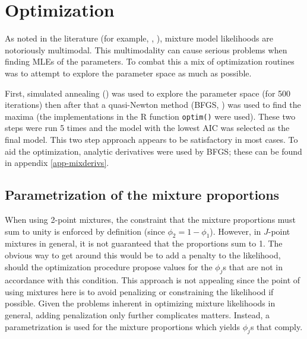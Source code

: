 
\section{Optimization}
\label{s:optimization}

As noted in the literature (for example, \cite[463-480]{BDA}, \cite{robert}), mixture model likelihoods are notoriously multimodal. This multimodality can cause serious problems when finding MLEs of the parameters. To combat this a mix of optimization routines was to attempt to explore the parameter space as  much as possible.

First, simulated annealing (\cite[pp. 549-554]{numrec}) was used to explore the parameter space (for 500 iterations) then after that a quasi-Newton method (BFGS, \cite{bfgs}) was used to find the maxima (the implementations in the \textsf{R} function \texttt{optim()} were used). These two steps were run 5 times and the model with the lowest AIC was selected as the final model. This two step approach appears to be satisfactory in most cases. To aid the optimization, analytic derivatives were used by BFGS; these can be found in appendix \ref{app-mixderivs}.

\subsection{Parametrization of the mixture proportions}
\label{ds-mixpar}

When using 2-point mixtures, the constraint that the mixture proportions must sum to unity is enforced by definition (since $\phi_2=1-\phi_1$). However, in $J$-point mixtures in general, it is not guaranteed that the proportions sum to 1. The obvious way to get around this would be to add a penalty to the likelihood, should the optimization procedure propose values for the $\phi_j$s that are not in accordance with this condition. This approach is not appealing since the point of using mixtures here is to avoid penalizing or constraining the likelihood if possible. Given the problems inherent in optimizing mixture likelihoods in general, adding penalization only further complicates matters. Instead, a parametrization is used for the mixture proportions which yields $\phi_j$s that comply.


